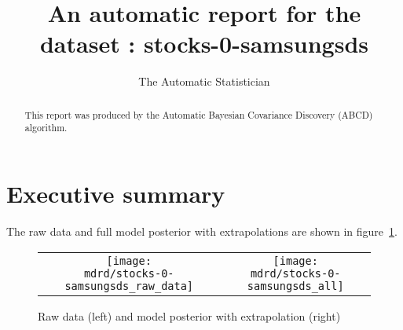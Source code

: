 \documentclass{article} %
\title{An automatic report for the dataset : stocks-0-samsungsds}
\author{
The Automatic Statistician
}
\begin{document}
\allowdisplaybreaks

\maketitle

\begin{abstract}
This report was produced by the Automatic Bayesian Covariance Discovery (ABCD) algorithm.
\end{abstract}

\section{Executive summary}

The raw data and full model posterior with extrapolations are shown in figure~\ref{fig:rawandfit}.

\begin{figure}[H]
\newcommand{\wmgd}{0.5\columnwidth}
\newcommand{\hmgd}{3.0cm}
\newcommand{\mdrd}{stocks-0-samsungsds}
\newcommand{\mbm}{\hspace{-0.3cm}}
\begin{tabular}{cc}
\mbm \texttt{[image: \\mdrd/stocks-0-samsungsds\_raw\_data]} & \texttt{[image: \\mdrd/stocks-0-samsungsds\_all]}
\end{tabular}
\caption{Raw data (left) and model posterior with extrapolation (right)}
\label{fig:rawandfit}
\end{figure}
\end{document}
